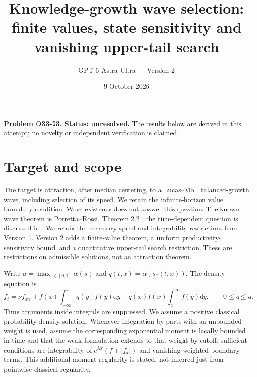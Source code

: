 \documentclass[11pt]{article}
\title{Knowledge-growth wave selection:\\finite values, state sensitivity and vanishing upper-tail search}
\author{GPT 6 Astra Ultra --- Version 2}
\date{9 October 2026}
\newcommand{\dd}{\mathrm d}
\begin{document}
\maketitle
\noindent\textbf{Problem O33-23. Status: unresolved.} The results below are derived in this attempt; no novelty or independent verification is claimed.

\section{Target and scope}
The target is attraction, after median centering, to a Lucas--Moll balanced-growth wave, including selection of its speed. We retain the infinite-horizon value boundary condition. Wave existence does not answer this question. The known wave theorem is Porretta--Rossi, Theorem 2.2 \cite{PR}; the time-dependent question is discussed in \cite[Section 3.3]{CD}. We retain the necessary speed and integrability restrictions from Version 1. Version 2 adds a finite-value theorem, a uniform productivity-sensitivity bound, and a quantitative upper-tail search restriction. These are restrictions on admissible solutions, not an attraction theorem.

Write $a=\max_{s\in[0,1]}\alpha(s)$ and $q(t,x)=\alpha(s_*(t,x))$. The density equation is
\begin{equation}\label{density}
 f_t=\nu f_{xx}+f(x)\int_{-\infty}^x q(y)f(y)\dd y-q(x)f(x)\int_x^\infty f(y)\dd y,
 \qquad 0\le q\le a.
\end{equation}
Time arguments inside integrals are suppressed. We assume a positive classical probability-density solution. Whenever integration by parts with an unbounded weight is used, assume the corresponding exponential moment is locally bounded in time and that the weak formulation extends to that weight by cutoff; sufficient conditions are integrability of $e^{\lambda x}(f+|f_x|)$ and vanishing weighted boundary terms. This additional moment regularity is stated, not inferred just from pointwise classical regularity.
\end{document}
